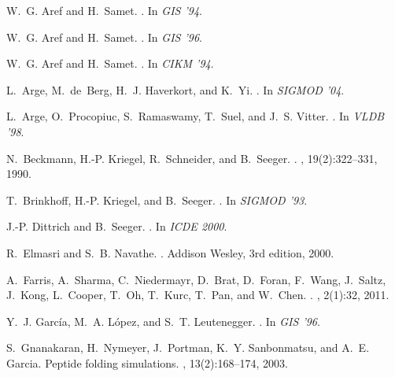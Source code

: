 \documentclass{sig-alternate}
\begin{document}
\begin{thebibliography}{10}
\vspace{2mm}

W.~G. Aref and H.~Samet.
.
\newblock In {\em GIS '94}.

W.~G. Aref and H.~Samet.
.
\newblock In {\em GIS '96}.

W.~G. Aref and H.~Samet.
.
\newblock In {\em CIKM '94}.

L.~Arge, M.~de~Berg, H.~J. Haverkort, and K.~Yi.
.
\newblock In {\em {SIGMOD '04}}.

L.~Arge, O.~Procopiuc, S.~Ramaswamy, T.~Suel, and J.~S. Vitter.
.
\newblock In {\em VLDB '98}.

N.~Beckmann, H.-P. Kriegel, R.~Schneider, and B.~Seeger.
.
, 19(2):322--331, 1990.

T.~Brinkhoff, H.-P. Kriegel, and B.~Seeger.
.
\newblock In {\em SIGMOD '93}.

J.-P. Dittrich and B.~Seeger.
.
\newblock In {\em ICDE 2000}.

R.~Elmasri and S.~B. Navathe.
.
\newblock Addison Wesley, 3rd edition, 2000.

A.~Farris, A.~Sharma, C.~Niedermayr, D.~Brat, D.~Foran, F.~Wang, J.~Saltz,
  J.~Kong, L.~Cooper, T.~Oh, T.~Kurc, T.~Pan, and W.~Chen.
.
, 2(1):32, 2011.

Y.~J. Garc\'ia, M.~A. L\'opez, and S.~T. Leutenegger.
.
\newblock In {\em GIS '96}.

S.~Gnanakaran, H.~Nymeyer, J.~Portman, K.~Y. Sanbonmatsu, and A.~E. Garcia.
\newblock Peptide folding simulations.
, 13(2):168--174, 2003.


\end{thebibliography}
\end{document}
